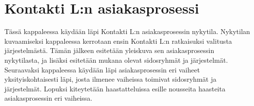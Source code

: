 \documentclass[finnish,12pt,a4paper,pdftex]{article}
\begin{document}



\section{Kontakti L:n asiakasprosessi}

Tässä kappaleessa käydään läpi Kontakti L:n asiakasprosessin nykytila. Nykytilan kuvaamiseksi kappaleessa kerrotaan ensin Kontakti L:n ratkaisuksi valitusta järjestelmästä. Tämän jälkeen esitetään yleiskuva sen asiakasprosessin nykytilasta, ja lisäksi esitetään mukana olevat sidosryhmät ja järjestelmät. Seuraavaksi kappaleessa käydään läpi asiakasprosessin eri vaiheet yksityiskohtaisesti läpi, josta ilmenee vaiheissa toimivat sidosryhmät ja järjestelmät. Lopuksi kiteytetään haastatteluissa esille nousseita haasteita asiakasprosessin eri vaiheissa.
\end{document}

